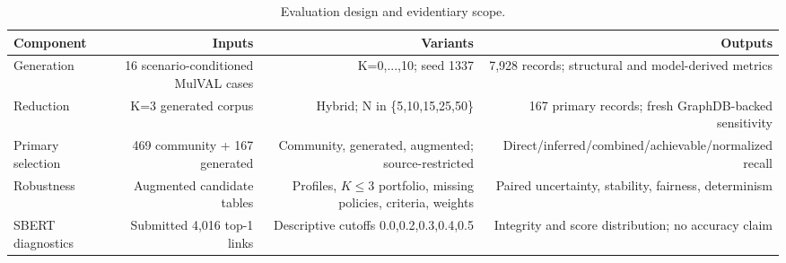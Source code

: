 \begin{table}[tb]
\centering
\caption{Evaluation design and evidentiary scope.}
\label{tab:corrected_evaluation_design}
\begin{tabular}{lrrr}
\toprule
Component & Inputs & Variants & Outputs \\
\midrule
Generation & 16 scenario-conditioned MulVAL cases & K=0,...,10; seed 1337 & 7,928 records; structural and model-derived metrics \\
Reduction & K=3 generated corpus & Hybrid; N in \{5,10,15,25,50\} & 167 primary records; fresh GraphDB-backed sensitivity \\
Primary selection & 469 community + 167 generated & Community, generated, augmented; source-restricted & Direct/inferred/combined/achievable/normalized recall \\
Robustness & Augmented candidate tables & Profiles, $K\leq3$ portfolio, missing policies, criteria, weights & Paired uncertainty, stability, fairness, determinism \\
SBERT diagnostics & Submitted 4,016 top-1 links & Descriptive cutoffs 0.0,0.2,0.3,0.4,0.5 & Integrity and score distribution; no accuracy claim \\
\bottomrule
\end{tabular}
\end{table}
